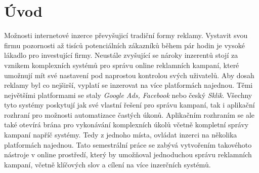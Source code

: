 \chapter{Úvod}
\label{chap:introduction}
Možnosti internetové inzerce převyšujicí tradiční formy reklamy. Vystavit svou firmu pozornosti až tisíců potenciálních zákazníků během pár hodin je vysoké lákadlo pro investující firmy. Neustále zvyšující se nároky inzerentů stojí za vznikem komplexních systémů
pro správu online reklamních kampaní, které umožnují mít své nastavení pod naprostou kontrolou svých uživatelů. Aby dosah reklamy byl co nejširší, vyplatí se inzerovat na více platformách najednou. Těmi největšími platformami se staly
\emph{Google Ads, Facebook} nebo český \emph{Sklik}. Všechny tyto systémy poskytují jak své vlastní řešení pro správu kampaní, tak i aplikační rozhraní pro možnosti automatizace častých úkonů.
Aplikačním rozhraním se ale také otevírá brána pro vykonávání komplexních úkolů včetně kompletní správy kampaní napříč systémy. Tedy z jednoho místa, ovládat inzerci na několika platformách najednou.
Tato semestrální práce se zabývá vytvořením takovéhoto nástroje v online prostředí, který by umožňoval jednoduchou správu reklamních kampaní, včetně klíčových slov a cílení
 na více inzerčních systémů. 

\endinput